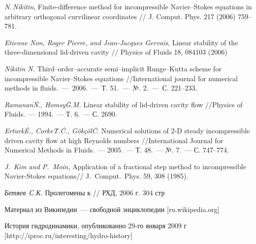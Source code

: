 \newpage

\begin{thebibliography}{99}


  \textit{N.\,Nikitin}, Finite-difference method for incompressible Navier–Stokes equations in 
  arbitrary orthogonal curvilinear coordinates // J. Comput. Phys. 217 (2006) 759–781.

  \textit{Etienne Non, Roger Pierre, and Jean-Jacques Gervais}, Linear stability of the 
  three-dimensional lid-driven cavity // Physics of Fluids 18, 084103 (2006)

	\textit{Nikitin N.} Third--order--accurate semi--implicit Runge--Kutta scheme for incompressible Navier--Stokes equations //International journal for numerical methods in fluids.~---~2006.~---~Т. 51.~---~№. 2.~---~С. 221--233.
  
   \textit{Ramanan\.N., Homsy\.G.\.M.} Linear stability of lid-driven cavity flow 
  //Physics of Fluids.~--- 1994.~--- Т. 6.~--- С. 2690.
  
   \textit{Erturk\.E., Corke\.T.\.C., Gökçöl\.C.} Numerical solutions of 2-D steady incompressible
  driven cavity flow at high Reynolds numbers //International Journal for Numerical Methods in 
  Fluids.~--- 2005.~--- Т. 48.~--- №. 7.~--- С. 747--774.

	\textit{J.~Kim and P.~Moin}, Application of a fractional step method to incompressible Navier-Stokes equations//
 J.~Comput.~Phys. 59, 308 (1985).

   \textit{Бетяев~С.К.} Пролегомены к // РХД, 2006 г. 304 стр
  
   Материал из Википедии~--- свободной энциклопедии [ru.wikipedia.org]

   История гидродинамики, опубликованно 29-го января 2009 г [http://iproc.ru/interesting/hydro-history]

\end{thebibliography}
